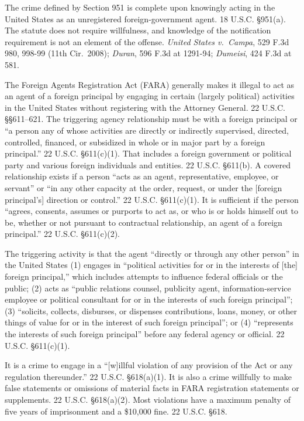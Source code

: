 The crime defined by Section 951 is complete upon knowingly acting in the United States as an unregistered foreign-government agent.
18 U.S.C. \S 951(a).
The statute does not require willfulness, and knowledge of the notification requirement is not an element of the offense.
\textit{United States v.\ Campa}, 529 F.3d 980, 998-99 (11th Cir.~2008); \textit{Duran}, 596 F.3d at 1291-94; \textit{Dumeisi}, 424 F.3d at 581.

The Foreign Agents Registration Act (FARA) generally makes it illegal to act as an agent of a foreign principal by engaging in certain (largely political) activities in the United States without registering with the Attorney General. 22 U.S.C. \S\S 611--621. The triggering agency relationship must be with a foreign principal or ``a person any of whose activities are directly or indirectly supervised, directed, controlled, financed, or subsidized in whole or in major part by a foreign principal.'' 22 U.S.C. \S 611(c)(1).
That includes a foreign government or political party and various foreign individuals and entities.
22 U.S.C. \S 611(b).
A covered relationship exists if a person ``acts as an agent, representative, employee, or servant'' or ``in any other capacity at the order, request, or under the [foreign principal's] direction or control.''
22 U.S.C. \S 611(c)(1).
It is sufficient if the person ``agrees, consents, assumes or purports to act as, or who is or holds himself out to be, whether or not pursuant to contractual relationship, an agent of a foreign principal.''
22 U.S.C. \S 611(c)(2).

The triggering activity is that the agent ``directly or through any other person'' in the United States (1) engages in ``political activities for or in the interests of [the] foreign principal,'' which includes attempts to influence federal officials or the public; (2) acts as ``public relations counsel, publicity agent, information-service employee or political consultant for or in the interests of such foreign principal''; (3) ``solicits, collects, disburses, or dispenses contributions, loans, money, or other things of value for or in the interest of such foreign principal''; or (4) ``represents the interests of such foreign principal'' before any federal agency or official.
22 U.S.C. \S 611(c)(1).

It is a crime to engage in a ``[w]illful violation of any provision of the Act or any regulation thereunder.''
22 U.S.C. \S 618(a)(1).
It is also a crime willfully to make false statements or omissions of material facts in FARA registration statements or supplements.
22 U.S.C. \S 618(a)(2).
Most violations have a maximum penalty of five years of imprisonment and a \$10,000 fine.
22 U.S.C. \S 618.

